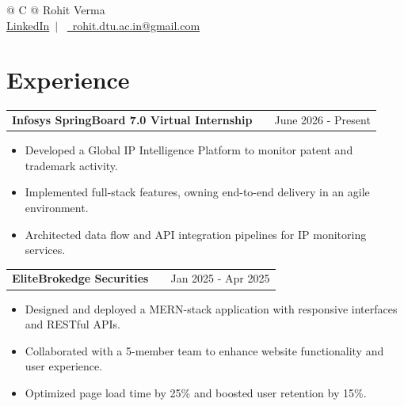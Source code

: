 \documentclass[a4paper,10pt]{article}
\makeatletter
\newenvironment{joblong}[2]
    {
    \begin{tabularx}{\linewidth}{@{}l X r@{}}
    \textbf{#1} & \hfill &  #2 \\[3.75pt]
    \end{tabularx}
    \begin{minipage}[t]{\linewidth}
    \begin{itemize}[nosep,after=\strut, leftmargin=1em, itemsep=3pt,label=--]
    }
    {
    \end{itemize}
    \end{minipage}    
    }
\makeatother
\begin{document}
\pagestyle{empty} 


\newcommand{\name}{Rohit Verma}
\newcommand{\emaila}{rohit.dtu.ac.in@gmail.com}
\newcommand{\linkedin}{\href{https://linkedin.com/in/rohit-verma-211rv}{LinkedIn}}

\begin{tabularx}{\linewidth}{@{} C @{}}
\Huge{\name}\\[7.5pt]

\linkedin \ $|$ \
\href{mailto:\emaila}{\raisebox{-0.05\height}\faEnvelope\ \emaila}
\end{tabularx}


\section{Experience}


\begin{joblong}{Infosys SpringBoard 7.0 Virtual Internship}{June 2026 - Present}
\textit{Python Developer Intern}\\[3pt]
\item Developed a Global IP Intelligence Platform to monitor patent and trademark activity.
\item Implemented full-stack features, owning end-to-end delivery in an agile environment.
\item Architected data flow and API integration pipelines for IP monitoring services.
\end{joblong}
\vspace{3pt}


\begin{joblong}{EliteBrokedge Securities}{Jan 2025 - Apr 2025}
\textit{Web Developer Intern}\\[3pt]
\item Designed and deployed a MERN-stack application with responsive interfaces and RESTful APIs.
\item Collaborated with a 5-member team to enhance website functionality and user experience.
\item Optimized page load time by 25\% and boosted user retention by 15\%.
\end{joblong}
\vspace{3pt}
\end{document}
